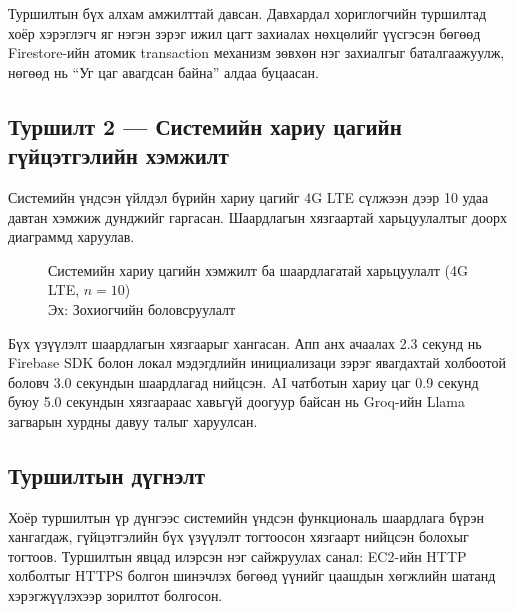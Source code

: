 Туршилтын бүх алхам амжилттай давсан. Давхардал хориглогчийн туршилтад хоёр хэрэглэгч яг нэгэн зэрэг ижил цагт захиалах нөхцөлийг үүсгэсэн бөгөөд Firestore-ийн атомик transaction механизм зөвхөн нэг захиалгыг баталгаажуулж, нөгөөд нь ``Уг цаг авагдсан байна'' алдаа буцаасан.

\subsection*{Туршилт 2 — Системийн хариу цагийн гүйцэтгэлийн хэмжилт}

Системийн үндсэн үйлдэл бүрийн хариу цагийг 4G LTE сүлжээн дээр 10 удаа давтан хэмжиж дунджийг гаргасан. Шаардлагын хязгаартай харьцуулалтыг доорх диаграммд харуулав.

\begin{figure}[h]
\centering
{}
\caption{Системийн хариу цагийн хэмжилт ба шаардлагатай харьцуулалт (4G LTE, $n=10$)\\{\footnotesize Эх: Зохиогчийн боловсруулалт}}
\label{fig:test_performance}
\end{figure}

Бүх үзүүлэлт шаардлагын хязгаарыг хангасан. Апп анх ачаалах 2.3 секунд нь Firebase SDK болон локал мэдэгдлийн инициализаци зэрэг явагдахтай холбоотой боловч 3.0 секундын шаардлагад нийцсэн. AI чатботын хариу цаг 0.9 секунд буюу 5.0 секундын хязгаараас хавьгүй доогуур байсан нь Groq-ийн Llama загварын хурдны давуу талыг харуулсан.

\subsection*{Туршилтын дүгнэлт}

Хоёр туршилтын үр дүнгээс системийн үндсэн функциональ шаардлага бүрэн хангагдаж, гүйцэтгэлийн бүх үзүүлэлт тогтоосон хязгаарт нийцсэн болохыг тогтоов. Туршилтын явцад илэрсэн нэг сайжруулах санал: EC2-ийн HTTP холболтыг HTTPS болгон шинэчлэх бөгөөд үүнийг цаашдын хөгжлийн шатанд хэрэгжүүлэхээр зорилтот болгосон.
